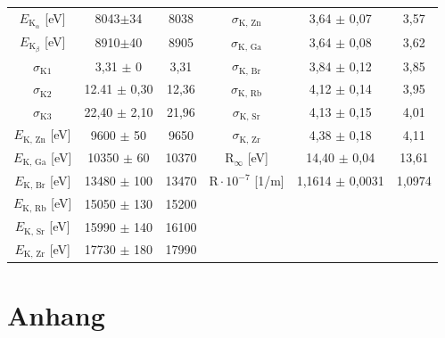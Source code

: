 \documentclass[titlepage = firstcover]{scrartcl}
\begin{document}
\begin{table}[h]
\begin{tabular}{c c c c c c }
                $E_{\text{K}_{\alpha}}$ [eV] & 8043$\pm$34      & 8038  & $\sigma_{\text{K, Zn}}$        & 3,64 $\pm$ 0,07      & 3,57   \\
                $E_{\text{K}_{\beta}}$ [eV]  & 8910$\pm$40       & 8905 & $\sigma_{\text{K, Ga}}$        & 3,64 $\pm$ 0,08      & 3,62   \\
                $\sigma_{\text{K1}}$         & 3,31 $\pm$ 0     & 3,31  & $\sigma_{\text{K, Br}}$        & 3,84 $\pm$ 0,12      & 3,85   \\
                $\sigma_{\text{K2}}$         & 12.41 $\pm$ 0,30 & 12,36 & $\sigma_{\text{K, Rb}}$        & 4,12 $\pm$ 0,14      & 3,95   \\
                $\sigma_{\text{K3}}$         & 22,40 $\pm$ 2,10 & 21,96 & $\sigma_{\text{K, Sr}}$        & 4,13 $\pm$ 0,15      & 4,01   \\
                $E_{\text{K, Zn}}$ [eV]      & 9600 $\pm$ 50    & 9650  & $\sigma_{\text{K, Zr}}$        & 4,38 $\pm$ 0,18      & 4,11   \\
                $E_{\text{K, Ga}}$ [eV]      & 10350 $\pm$ 60   & 10370 & $\text{R}_{\infty}$ [eV]       & 14,40 $\pm$ 0,04     & 13,61  \\
                $E_{\text{K, Br}}$ [eV]      & 13480 $\pm$ 100  & 13470 & $\text{R} \cdot 10^{-7}$ [1/m] & 1,1614 $\pm$ 0,0031  & 1,0974 \\
                $E_{\text{K, Rb}}$ [eV]      & 15050 $\pm$ 130  & 15200 &                                &                      &        \\
                $E_{\text{K, Sr}}$ [eV]      & 15990 $\pm$ 140  & 16100 &                                &                      &        \\
                $E_{\text{K, Zr}}$ [eV]      & 17730 $\pm$ 180  & 17990 &                                &                      &        \\
                \bottomrule
            \end{tabular}
        \end{table}



            \newpage
            \section{Anhang}
            \FloatBarrier
\end{document}
